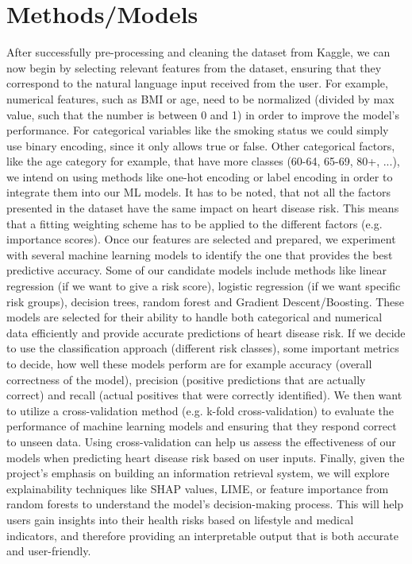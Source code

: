 \documentclass{article}
\begin{document}
\section{Methods/Models}
After successfully pre-processing and cleaning the dataset from Kaggle, we can now begin by selecting relevant features from the dataset, ensuring that they correspond to the natural language input received from the user. For example, numerical features, such as BMI or age, need to be normalized (divided by max value, such that the number is between 0 and 1) in order to improve the model’s performance. For categorical variables like the smoking status we could simply use binary encoding, since it only allows true or false. Other categorical factors, like the age category for example, that have more classes (60-64, 65-69, 80+, ...), we intend on using methods like one-hot encoding or label encoding in order to integrate them into our ML models. It has to be noted, that not all the factors presented in the dataset have the same impact on heart disease risk. This means that a fitting weighting scheme has to be applied to the different factors (e.g. importance scores). Once our features are selected and prepared, we experiment with several machine learning models to identify the one that provides the best predictive accuracy. Some of our candidate models include methods like linear regression (if we want to give a risk score), logistic regression (if we want specific risk groups), decision trees, random forest and Gradient Descent/Boosting. These models are selected for their ability to handle both categorical and numerical data efficiently and provide accurate predictions of heart disease risk. If we decide to use the classification approach (different risk classes), some important metrics to decide, how well these models perform are for example accuracy (overall correctness of the model), precision (positive predictions that are actually correct) and recall (actual positives that were correctly identified). We then want to utilize a cross-validation method (e.g. k-fold cross-validation) to evaluate the performance of machine learning models and ensuring that they respond correct to unseen data. Using cross-validation can help us assess the effectiveness of our models when predicting heart disease risk based on user inputs. Finally, given the project’s emphasis on building an information retrieval system, we will explore explainability techniques like SHAP values, LIME, or feature importance from random forests to understand the model’s decision-making process. This will help users gain insights into their health risks based on lifestyle and medical indicators, and therefore providing an interpretable output that is both accurate and user-friendly.
\end{document}
